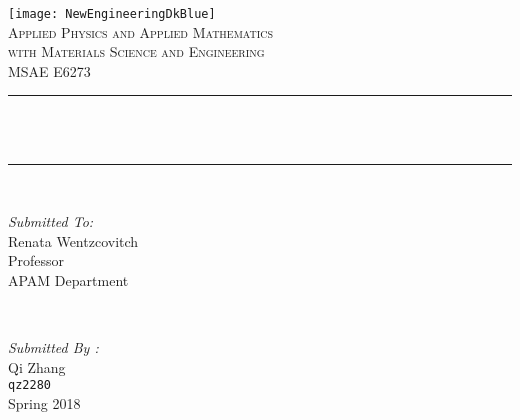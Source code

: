 
\begin{titlepage}
	\centering
	\vspace*{0.5 cm}
	\texttt{[image: NewEngineeringDkBlue]}\\[1.0 cm]	%
	\textsc{\Large Applied Physics and Applied Mathematics\\
		\large with Materials Science and Engineering}\\[2.0 cm]	%
	\textsc{\Large MSAE E6273}\\[0.5 cm]				%
	\rule{\linewidth}{0.2 mm} \\[0.4 cm]
	{ \huge \bfseries \thetitle}\\
	\rule{\linewidth}{0.2 mm} \\[1.5 cm]

	\begin{minipage}{0.4\textwidth}
		\begin{flushleft} \large
			\emph{Submitted To:}\\
			Renata Wentzcovitch\\
			Professor\\
			APAM Department\\
		\end{flushleft}
	\end{minipage}~
	\begin{minipage}{0.4\textwidth}

		\begin{flushright} \large
			\emph{Submitted By :} \\
			Qi Zhang\\
			\texttt{qz2280}\\
			Spring 2018\\
		\end{flushright}

	\end{minipage}\\[2 cm]
\end{titlepage}
